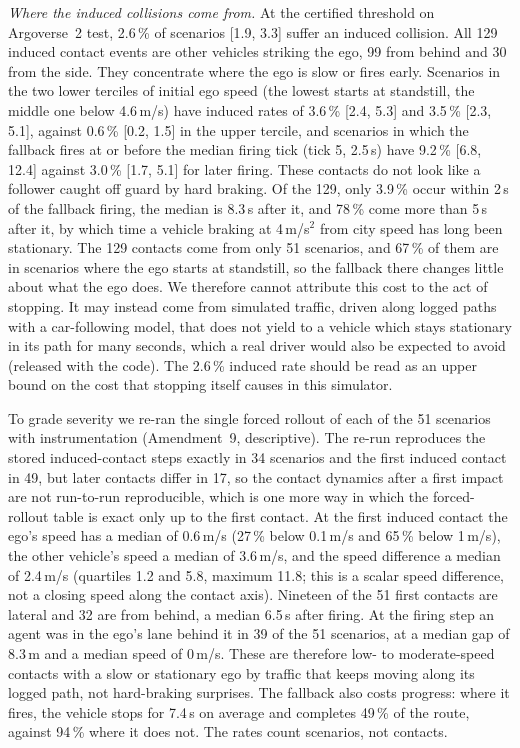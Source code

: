 \documentclass[lettersize,journal]{IEEEtran}
\begin{document}
\emph{Where the induced collisions come from.} At the certified threshold
on Argoverse~2 test, 2.6\,\% of scenarios [1.9, 3.3] suffer an induced
collision. All 129 induced contact events are other vehicles striking the
ego, 99 from behind and 30 from the side. They concentrate where
the ego is slow or fires early. Scenarios in the two lower terciles of
initial ego speed (the lowest starts at standstill, the middle one below
4.6\,m/s) have induced rates of 3.6\,\% [2.4, 5.3]
and 3.5\,\% [2.3, 5.1], against 0.6\,\% [0.2, 1.5] in the upper tercile, and
scenarios in which the fallback fires at or before the median firing tick
(tick 5, 2.5\,s) have 9.2\,\% [6.8, 12.4] against 3.0\,\% [1.7, 5.1]
for later firing. These contacts do not look like a follower caught off
guard by hard braking. Of the 129, only 3.9\,\% occur within 2\,s of the
fallback firing, the median is 8.3\,s after it, and 78\,\% come more than
5\,s after it, by which time a vehicle braking at 4\,m/s$^2$ from city speed
has long been stationary. The 129 contacts come from only 51 scenarios,
and 67\,\% of them are in scenarios where the ego starts at standstill, so
the fallback there changes little about what the ego does. We therefore
cannot attribute this cost to the act of stopping. It may instead come
from simulated traffic, driven along logged paths with a car-following
model, that does not yield to a vehicle which stays stationary in its path
for many seconds, which a real driver would also be expected to avoid
(released with the code). The 2.6\,\%
induced rate should be read as an upper bound on the cost that stopping
itself causes in this simulator.

To grade severity we re-ran the single forced rollout of each of the 51
scenarios with instrumentation (Amendment~9, descriptive). The re-run
reproduces the stored induced-contact steps exactly in 34 scenarios and
the first induced contact in 49, but later contacts differ in 17, so
the contact dynamics after a first impact are not run-to-run reproducible,
which is one more way in which the forced-rollout table is exact only up
to the first contact. At the first induced contact the ego's speed has a
median of 0.6\,m/s (27\,\% below 0.1\,m/s and 65\,\% below 1\,m/s), the other
vehicle's speed a median of 3.6\,m/s, and the speed difference a median of
2.4\,m/s (quartiles 1.2 and 5.8, maximum 11.8; this is a scalar speed
difference, not a closing speed along the contact axis). Nineteen of the
51 first contacts are lateral and 32 are from behind, a median 6.5\,s after
firing. At the firing step an agent was in the ego's lane behind it in 39
of the 51 scenarios, at a median gap of 8.3\,m and a median speed of
0\,m/s. These are therefore low- to moderate-speed contacts with a slow or
stationary ego by traffic that keeps moving along its logged path, not
hard-braking surprises. The fallback also costs progress: where it fires,
the vehicle stops for 7.4\,s on average and completes 49\,\% of the route,
against 94\,\% where it does not. The rates count scenarios, not contacts.
\end{document}
